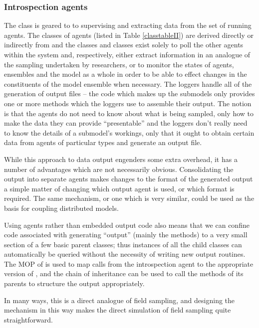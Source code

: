 \subsubsection{Introspection agents}
The  class is geared to to supervising and
extracting data from the set of running agents.  The classes of agents
(listed in Table \ref{classtableII}) are derived directly or
indirectly from  and the classes 
and  classes exist solely to poll the other agents
within the system and, respectively, either extract information in an
analogue of the sampling undertaken by researchers, or to monitor the
states of agents, ensembles and the model as a whole in order to be
able to effect changes in the constituents of the model ensemble when
necessary. The loggers handle all of the generation of output files --
the code which makes up the submodels only provides one or
more  methods which the loggers use to assemble their
output.  The notion is that the agents do not need to know about what
is being sampled, only how to make the data they can provide
``presentable'' and the loggers don't really need to know the details
of a submodel's workings, only that it ought to obtain certain data
from agents of particular types and generate an output file.

While this approach to data output engenders some extra overhead, it
has a number of advantages which are not necessarily
obvious. Consolidating the output into separate agents makes changes
to the format of the generated output a simple matter of changing
which output agent is used, or which format is required. The same
mechanism, or one which is very similar, could be used as the basis
for coupling distributed models.

Using \mlogger agents rather than embedded output code also means that
we can confine code associated with generating ``output'' (mainly
the  methods) to a very small section of a few basic
parent classes; thus instances of all the child classes can
automatically be queried without the necessity of writing new output
routines.  The MOP of \SCLOS is used to map calls from the
introspection agent to the appropriate version of ,
and the chain of inheritance can be used to call the 
methods of its parents to structure the output appropriately.

In many ways, this is a direct analogue of field sampling, and
designing the mechanism in this way makes the direct simulation of
field sampling quite straightforward.

